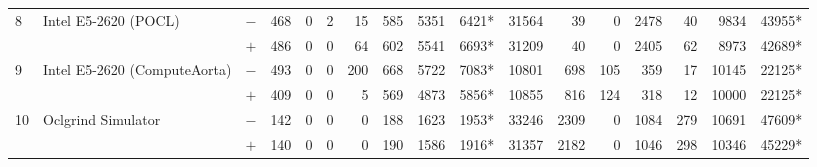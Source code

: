\begin{tabular}{lll | rrrrrrr | rrrrrrr }
\hline
\multirow{ 2}{*}{8} & \multirow{ 2}{*}{Intel E5-2620 (POCL)} & $-$ & 468 & 0 & 2 & 15 & 585 & 5351 & 6421*       & 31564 & 39 & 0 & 2478 & 40 & 9834 & 43955* \\& & $+$ & 486 & 0 & 0 & 64 & 602 & 5541 & 6693* & 31209 & 40 & 0 & 2405 & 62 & 8973 & 42689* \\
\hline
\multirow{ 2}{*}{9} & \multirow{ 2}{*}{Intel E5-2620 (ComputeAorta)} & $-$ & 493 & 0 & 0 & 200 & 668 & 5722 & 7083*       & 10801 & 698 & 105 & 359 & 17 & 10145 & 22125* \\& & $+$ & 409 & 0 & 0 & 5 & 569 & 4873 & 5856* & 10855 & 816 & 124 & 318 & 12 & 10000 & 22125* \\
\hline
\multirow{ 2}{*}{10} & \multirow{ 2}{*}{Oclgrind Simulator} & $-$ & 142 & 0 & 0 & 0 & 188 & 1623 & 1953*       & 33246 & 2309 & 0 & 1084 & 279 & 10691 & 47609* \\& & $+$ & 140 & 0 & 0 & 0 & 190 & 1586 & 1916* & 31357 & 2182 & 0 & 1046 & 298 & 10346 & 45229* \\
  \bottomrule
\end{tabular}

